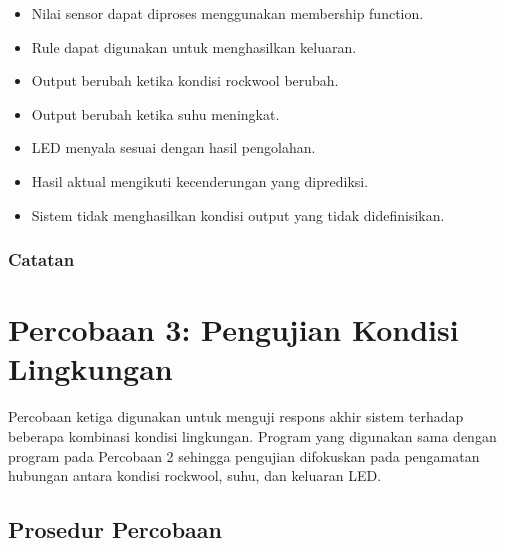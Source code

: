 \documentclass[12pt,a4paper]{article}
\begin{document}
\begin{itemize}
    \item [ ] Nilai sensor dapat diproses menggunakan membership function.
    \item [ ] Rule dapat digunakan untuk menghasilkan keluaran.
    \item [ ] Output berubah ketika kondisi rockwool berubah.
    \item [ ] Output berubah ketika suhu meningkat.
    \item [ ] LED menyala sesuai dengan hasil pengolahan.
    \item [ ] Hasil aktual mengikuti kecenderungan yang diprediksi.
    \item [ ] Sistem tidak menghasilkan kondisi output yang tidak didefinisikan.
\end{itemize}

\subsubsection*{Catatan}

\noindent
\makebox[\textwidth]{\hrulefill}

\vspace{0.4cm}
\makebox[\textwidth]{\hrulefill}

\vspace{0.4cm}
\makebox[\textwidth]{\hrulefill}

\section{Percobaan 3: Pengujian Kondisi Lingkungan}

Percobaan ketiga digunakan untuk menguji respons akhir sistem terhadap beberapa kombinasi kondisi lingkungan. Program yang digunakan sama dengan program pada Percobaan 2 sehingga pengujian difokuskan pada pengamatan hubungan antara kondisi rockwool, suhu, dan keluaran LED.

\subsection{Prosedur Percobaan}
\end{document}
